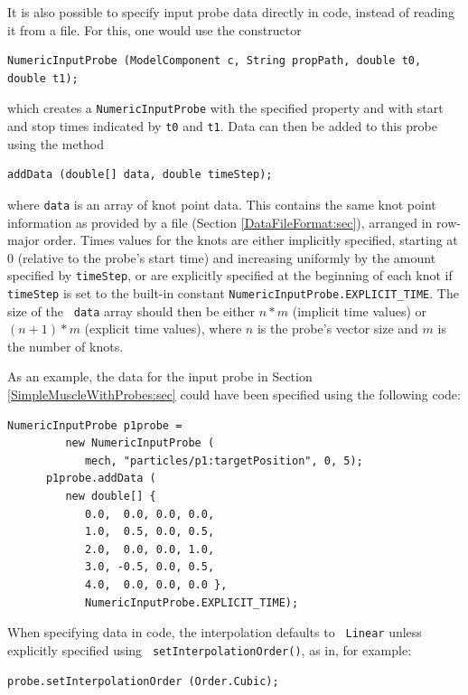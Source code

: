 It is also possible to specify input probe data directly in code,
instead of reading it from a file. For this, one would use the
constructor
%
\begin{lstlisting}[]
   NumericInputProbe (ModelComponent c, String propPath, double t0, double t1);
\end{lstlisting}
%
which creates a {\tt NumericInputProbe} with the specified property
and with start and stop times indicated by {\tt t0} and {\tt t1}.
Data can then be added to this probe using the method
%
\begin{lstlisting}[]
   addData (double[] data, double timeStep);
\end{lstlisting}
%
where {\tt data} is an array of knot point data. This contains the
same knot point information as provided by a file (Section
\ref{DataFileFormat:sec}), arranged in row-major order.  Times values
for the knots are either implicitly specified, starting at 0 (relative
to the probe's start time) and increasing uniformly by the amount
specified by {\tt timeStep}, or are explicitly specified at the
beginning of each knot if {\tt timeStep} is set to the built-in
constant {\tt NumericInputProbe.EXPLICIT\_TIME}. The size of the {\tt
data} array should then be either $n*m$ (implicit time values) or
$(n+1)*m$ (explicit time values), where $n$ is the probe's vector size
and $m$ is the number of knots.

As an example, the data for the input probe in Section
\ref{SimpleMuscleWithProbes:sec} could have been specified
using the following code:
%
\begin{lstlisting}[]
      NumericInputProbe p1probe =
         new NumericInputProbe (
            mech, "particles/p1:targetPosition", 0, 5);
      p1probe.addData (
         new double[] {
            0.0,  0.0, 0.0, 0.0,
            1.0,  0.5, 0.0, 0.5,
            2.0,  0.0, 0.0, 1.0,
            3.0, -0.5, 0.0, 0.5,
            4.0,  0.0, 0.0, 0.0 },
            NumericInputProbe.EXPLICIT_TIME);
\end{lstlisting}

When specifying data in code, the interpolation defaults to {\tt
Linear} unless explicitly specified using {\tt
setInterpolationOrder()}, as in, for example:
%
\begin{lstlisting}[]
   probe.setInterpolationOrder (Order.Cubic);
\end{lstlisting}
%
%
